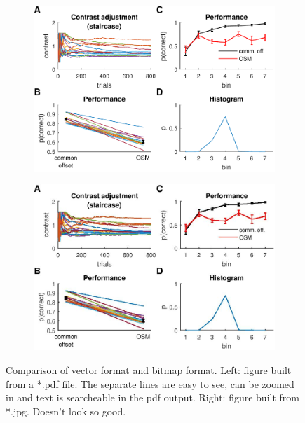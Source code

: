 \begin{figure}[t]
	\centering
	
	\begin{subfigure}[t]{0.45\textwidth}
		\centering
		\includegraphics[width=\linewidth]{Figures/Resultspdf} 
	\end{subfigure}		
	\hfill %
	\begin{subfigure}[t]{0.45\textwidth}
		\centering
		\includegraphics[width=\linewidth]{Figures/Resultsjpg} 
	\end{subfigure}
	
	
	\caption{Comparison of vector format and bitmap format. Left: figure built from a *.pdf file. The separate lines are easy to see, can be zoomed in and text is searcheable in the pdf output. Right: figure built from *.jpg. Doesn't look so good.}
	\label{pdf_vs_jpg}
\end{figure}
